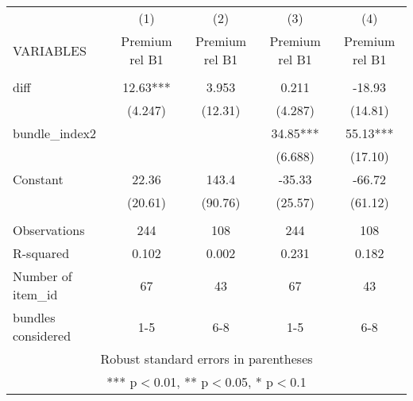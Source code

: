 \documentclass[]{article}
\begin{document}
\begin{tabular}{lcccc} \hline
 & (1) & (2) & (3) & (4) \\
VARIABLES & Premium rel B1 & Premium rel B1 & Premium rel B1 & Premium rel B1 \\ \hline
 &  &  &  &  \\
diff & 12.63*** & 3.953 & 0.211 & -18.93 \\
 & (4.247) & (12.31) & (4.287) & (14.81) \\
bundle\_index2 &  &  & 34.85*** & 55.13*** \\
 &  &  & (6.688) & (17.10) \\
Constant & 22.36 & 143.4 & -35.33 & -66.72 \\
 & (20.61) & (90.76) & (25.57) & (61.12) \\
 &  &  &  &  \\
Observations & 244 & 108 & 244 & 108 \\
R-squared & 0.102 & 0.002 & 0.231 & 0.182 \\
Number of item\_id & 67 & 43 & 67 & 43 \\
 bundles considered & 1-5 & 6-8 & 1-5 & 6-8 \\ \hline
\multicolumn{5}{c}{ Robust standard errors in parentheses} \\
\multicolumn{5}{c}{ *** p$<$0.01, ** p$<$0.05, * p$<$0.1} \\
\end{tabular}
\end{document}
